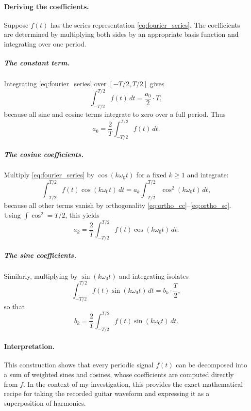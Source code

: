 \documentclass{article}
\begin{document}
\paragraph{Deriving the coefficients.}
Suppose $f(t)$ has the series representation \eqref{eq:fourier_series}. 
The coefficients are determined by multiplying both sides by an appropriate basis function and integrating over one period.

\subparagraph{The constant term.}
Integrating \eqref{eq:fourier_series} over $[-T/2,T/2]$ gives
\begin{equation}
    \int_{-T/2}^{T/2} f(t)\,dt = \frac{a_0}{2} \cdot T,
\end{equation}
because all sine and cosine terms integrate to zero over a full period. Thus
\begin{equation}
    a_0 = \frac{2}{T} \int_{-T/2}^{T/2} f(t)\,dt.
    \label{eq:fourier_a0}
\end{equation}

\subparagraph{The cosine coefficients.}
Multiply \eqref{eq:fourier_series} by $\cos(k\omega_0 t)$ for a fixed $k\geq1$ and integrate:
\begin{equation}
    \int_{-T/2}^{T/2} f(t)\cos(k\omega_0 t)\,dt 
    = a_k \int_{-T/2}^{T/2}\cos^2(k\omega_0 t)\,dt,
\end{equation}
because all other terms vanish by orthogonality \eqref{eq:ortho_cc}--\eqref{eq:ortho_sc}. Using $\int \cos^2= T/2$, this yields
\begin{equation}
    a_k = \frac{2}{T}\int_{-T/2}^{T/2} f(t)\cos(k\omega_0 t)\,dt.
    \label{eq:fourier_ak}
\end{equation}

\subparagraph{The sine coefficients.}
Similarly, multiplying by $\sin(k\omega_0 t)$ and integrating isolates
\begin{equation}
    \int_{-T/2}^{T/2} f(t)\sin(k\omega_0 t)\,dt = b_k \cdot \frac{T}{2},
\end{equation}
so that
\begin{equation}
    b_k = \frac{2}{T}\int_{-T/2}^{T/2} f(t)\sin(k\omega_0 t)\,dt.
    \label{eq:fourier_bk}
\end{equation}

\paragraph{Interpretation.}
This construction shows that every periodic signal $f(t)$ can be decomposed into a sum of weighted sines and cosines, 
whose coefficients are computed directly from $f$. In the context of my investigation, this provides the exact mathematical recipe for taking the recorded guitar waveform and expressing it as a superposition of harmonics.
\end{document}
